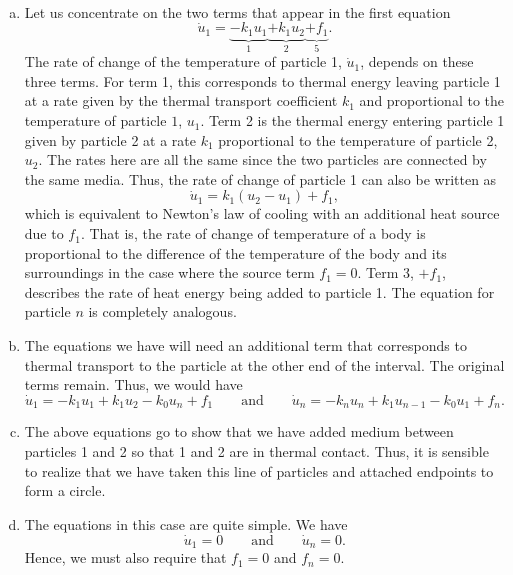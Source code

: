 \documentclass[12pt]{article} %
\begin{document}
\begin{solution}~
\begin{enumerate}[(a)]
    \item Let us concentrate on the two terms that appear in the first equation
    \[
\dot{u}_1 = \underbrace{-k_1 u_1}_{1} \underbrace{+ k_1 u_{2}}_{2}\underbrace{+f_1}_5.
    \]
    The rate of change of the temperature of particle 1, $\dot{u}_1$, depends on these three terms. For term 1, this corresponds to thermal energy leaving particle 1 at a rate given by the thermal transport coefficient $k_1$ and proportional to the temperature of particle $1$, $u_1$. Term 2 is the thermal energy entering particle 1 given by particle 2 at a rate $k_1$ proportional to the temperature of particle 2, $u_2$. The rates here are all the same since the two particles are connected by the same media. Thus, the rate of change of particle 1 can also be written as
    \[
    \dot{u}_1 = k_1(u_2-u_1) +f_1,
    \]
    which is equivalent to Newton's law of cooling with an additional heat source due to $f_1$. That is, the rate of change of temperature of a body is proportional to the difference of the temperature of the body and its surroundings in the case where the source term $f_1=0$. Term 3, $+f_1$, describes the rate of heat energy being added to particle 1. The equation for particle $n$ is completely analogous.

    \item The equations we have will need an additional term that corresponds to thermal transport to the particle at the other end of the interval. The original terms remain. Thus, we would have
    \[
\dot{u}_1 = -k_1 u_1 + k_1 u_{2} -k_0 u_n + f_1 \qquad \textrm{and} \qquad \dot{u}_n = -k_n u_{n} + k_1 u_{n-1} - k_0 u_1 + f_n.
    \]
    
    \item The above equations go to show that we have added medium between particles 1 and 2 so that 1 and 2 are in thermal contact. Thus, it is sensible to realize that we have taken this line of particles and attached endpoints to form a circle.

    \item The equations in this case are quite simple. We have
    \[
    \dot{u}_1 = 0 \qquad \textrm{and} \qquad \dot{u}_n = 0.
    \]
    Hence, we must also require that $f_1=0$ and $f_n=0$.
    


\end{enumerate}
\end{solution}
\end{document}
